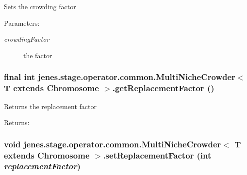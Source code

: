 Sets the crowding factor

\begin{Desc}
\item[Parameters:]
\begin{description}
\item[{\em crowdingFactor}]the factor \end{description}
\end{Desc}
\hypertarget{classjenes_1_1stage_1_1operator_1_1common_1_1_multi_niche_crowder_3_01_t_01extends_01_chromosome_01_4_97c2ba03c48234566aea9fcf49b677ee}{
\subsubsection[getReplacementFactor]{\setlength{\rightskip}{0pt plus 5cm}final int jenes.stage.operator.common.MultiNicheCrowder$<$ T extends Chromosome $>$.getReplacementFactor ()}}
\label{classjenes_1_1stage_1_1operator_1_1common_1_1_multi_niche_crowder_3_01_t_01extends_01_chromosome_01_4_97c2ba03c48234566aea9fcf49b677ee}


Returns the replacement factor

\begin{Desc}
\item[Returns:]\end{Desc}
\hypertarget{classjenes_1_1stage_1_1operator_1_1common_1_1_multi_niche_crowder_3_01_t_01extends_01_chromosome_01_4_3cf07082299cbe94d975a9af638a2098}{
\subsubsection[setReplacementFactor]{\setlength{\rightskip}{0pt plus 5cm}void jenes.stage.operator.common.MultiNicheCrowder$<$ T extends Chromosome $>$.setReplacementFactor (int {\em replacementFactor})}}
\label{classjenes_1_1stage_1_1operator_1_1common_1_1_multi_niche_crowder_3_01_t_01extends_01_chromosome_01_4_3cf07082299cbe94d975a9af638a2098}


